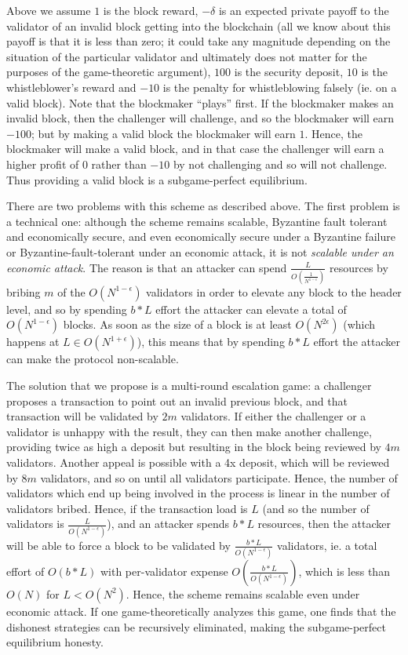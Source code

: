 \documentclass[11pt,a4paper]{report}
\theoremstyle{plain}
\theoremstyle{definition}
\theoremstyle{remark}
\begin{document}
Above we assume $1$ is the block reward, $-\delta$ is an expected private payoff to the validator of an invalid block getting into the blockchain (all we know about this payoff is that it is less than zero; it could take any magnitude depending on the situation of the particular validator and ultimately does not matter for the purposes of the game-theoretic argument), $100$ is the security deposit, $10$ is the whistleblower's reward and $-10$ is the penalty for whistleblowing falsely (ie. on a valid block). Note that the blockmaker ``plays'' first. If the blockmaker makes an invalid block, then the challenger will challenge, and so the blockmaker will earn $-100$; but by making a valid block the blockmaker will earn $1$. Hence, the blockmaker will make a valid block, and in that case the challenger will earn a higher profit of $0$ rather than $-10$ by not challenging and so will not challenge. Thus providing a valid block is a subgame-perfect equilibrium.

There are two problems with this scheme as described above. The first problem is a technical one: although the scheme remains scalable, Byzantine fault tolerant and economically secure, and even economically secure under a Byzantine failure or Byzantine-fault-tolerant under an economic attack, it is not \emph{scalable under an economic attack}. The reason is that an attacker can spend $\frac{L}{O(\frac{1}{N^{1-\epsilon}})}$ resources by bribing $m$ of the $O(N^{1-\epsilon})$ validators in order to elevate any block to the header level, and so by spending $b * L$ effort the attacker can elevate a total of $O(N^{1-\epsilon})$ blocks. As soon as the size of a block is at least $O(N^{2\epsilon})$ (which happens at $L \in O(N^{1+\epsilon})$), this means that by spending $b * L$ effort the attacker can make the protocol non-scalable.

The solution that we propose is a multi-round escalation game: a challenger proposes a transaction to point out an invalid previous block, and that transaction will be validated by $2m$ validators. If either the challenger or a validator is unhappy with the result, they can then make another challenge, providing twice as high a deposit but resulting in the block being reviewed by $4m$ validators. Another appeal is possible with a 4x deposit, which will be reviewed by $8m$ validators, and so on until all validators participate. Hence, the number of validators which end up being involved in the process is linear in the number of validators bribed. Hence, if the transaction load is $L$ (and so the number of validators is $\frac{L}{O(N^{1-\epsilon})}$), and an attacker spends $b * L$ resources, then the attacker will be able to force a block to be validated by $\frac{b * L}{O(N^{1-\epsilon})}$ validators, ie. a total effort of $O(b * L)$ with per-validator expense $O(\frac{b * L}{O(N^{1-\epsilon})})$, which is less than $O(N)$ for $L < O(N^2)$. Hence, the scheme remains scalable even under economic attack. If one game-theoretically analyzes this game, one finds that the dishonest strategies can be recursively eliminated, making the subgame-perfect equilibrium honesty.
\end{document}
